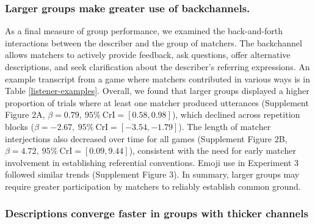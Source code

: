\documentclass[
  english,
]{article}
\begin{document}
\hypertarget{larger-groups-make-greater-use-of-backchannels.}{%
\subsubsection{Larger groups make greater use of backchannels.}\label{larger-groups-make-greater-use-of-backchannels.}}

As a final measure of group performance, we examined the back-and-forth interactions between the describer and the group of matchers.
The backchannel allows matchers to actively provide feedback, ask questions, offer alternative descriptions, and seek clarification about the describer's referring expressions.
An example transcript from a game where matchers contributed in various ways is in Table \ref{listener-examples}.
Overall, we found that larger groups displayed a higher proportion of trials where at least one matcher produced utterances (Supplement Figure 2A, \(\beta=0.79,\:95\%\:\mathrm{CrI}=[0.58, 0.98]\)), which declined across repetition blocks (\(\beta=-2.67,\:95\%\:\mathrm{CrI}=[-3.54, -1.79]\)).
The length of matcher interjections also decreased over time for all games (Supplement Figure 2B, \(\beta=4.72,\:95\%\:\mathrm{CrI}=[0.09, 9.44]\)), consistent with the need for early matcher involvement in establishing referential conventions.
Emoji use in Experiment 3 followed similar trends (Supplement Figure 3).
In summary, larger groups may require greater participation by matchers to reliably establish common ground.

\hypertarget{descriptions-converge-faster-in-groups-with-thicker-channels}{%
\subsubsection{Descriptions converge faster in groups with thicker channels}\label{descriptions-converge-faster-in-groups-with-thicker-channels}}
\end{document}
